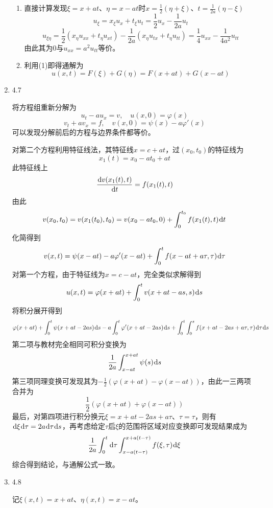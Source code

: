 \documentclass[a4paper,UTF8,fontset=windows,10pt]{ctexart}
\newcommand*{\dr}{\hspace{0.07em}\mathrm{d}}
\begin{document}
\begin{enumerate}
\begin{enumerate}[(1)]
        \item 
        直接计算发现$\xi=x+at$、$\eta=x-at$时$x=\frac{1}{2}(\eta+\xi)$、$t=\frac{1}{2a}(\eta-\xi)$
        $$u_\xi=x_\xi u_x+t_\xi u_t=\frac{1}{2}u_x-\frac{1}{2a}u_t$$
        $$u_{\xi\eta}=\frac{1}{2}(x_\eta u_{xx}+t_\eta u_{xt})-\frac{1}{2a}(x_\eta u_{tx}+t_\eta u_{tt})=\frac{1}{4}u_{xx}-\frac{1}{4a^2}u_{tt}$$
        由此其为0与$u_{xx}=a^2u_{tt}$等价。
    
        \item 
        利用(1)即得通解为
        $$u(x,t)=F(\xi)+G(\eta)=F(x+at)+G(x-at)$$
    \end{enumerate}
    
    \item 4.7
    
    将方程组重新分解为
    $$u_t-au_x=v,\quad u(x,0)=\varphi(x)$$
    $$v_t+av_x=f,\quad v(x,0)=\psi(x)-a\varphi'(x)$$
    可以发现分解前后的方程与边界条件都等价。
    
    对第二个方程利用特征线法，其特征线$x=c+at$，过$(x_0,t_0)$的特征线为
    $$x_1(t)=x_0-at_0+at$$
    此特征线上
    $$\frac{\dr v(x_1(t),t)}{\dr t}=f(x_1(t),t)$$
    由此
    $$v(x_0,t_0)=v(x_1(t_0),t_0)=v(x_0-at_0,0)+\int_0^{t_0}f(x_1(t),t)\dr t$$
    化简得到
    $$v(x,t)=\psi(x-at)-a\varphi'(x-at)+\int_0^tf(x-at+a\tau,\tau)\dr\tau$$
    对第一个方程，由于特征线为$x=c-at$，完全类似求解得到
    $$u(x,t)=\varphi(x+at)+\int_0^tv(x+at-as,s)\dr s$$
    将积分展开得到
    $$\varphi(x+at)+\int_0^t\psi(x+at-2as)\dr s-a\int_0^t\varphi'(x+at-2as)\dr s+\int_0^t\int_0^sf(x+at-2as+a\tau,\tau)\dr\tau\dr s$$
    第二项与教材完全相同可积分变换为
    $$\frac{1}{2a}\int_{x-at}^{x+at}\psi(s)\dr s$$
    第三项同理变换可发现其为$-\frac{1}{2}(\varphi(x+at)-\varphi(x-at))$，由此一三两项合并为
    $$\frac{1}{2}(\varphi(x+at)+\varphi(x-at))$$
    最后，对第四项进行积分换元$\xi=x+at-2as+a\tau$、$\tau=\tau$，则有$\dr\xi\dr\tau=2a\dr\tau\dr s$，再考虑给定$\tau$后$\xi$的范围将区域对应变换即可发现结果成为
    $$\frac{1}{2a}\int_0^t\dr\tau\int_{x-a(t-\tau)}^{x+a(t-\tau)}f(\xi,\tau)\dr\xi$$
    综合得到结论，与通解公式一致。
    
    \item 4.8
    
    记$\xi(x,t)=x+at$、$\eta(x,t)=x-at$。
    
    \
    

\end{enumerate}
\end{document}
